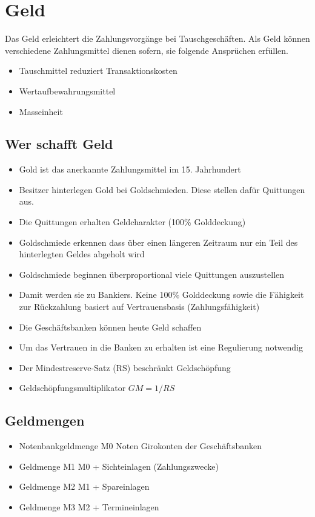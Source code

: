\section{Geld}
Das Geld erleichtert die Zahlungsvorgänge bei Tauschgeschäften. Als Geld können verschiedene Zahlungsmittel dienen sofern, sie folgende Ansprüchen erfüllen.
\begin{itemize}
	\item Tauschmittel reduziert Transaktionskosten
	\item Wertaufbewahrungsmittel
	\item Masseinheit
\end{itemize}
\subsection{Wer schafft Geld}
\begin{itemize}
	\item Gold ist das anerkannte Zahlungsmittel im 15. Jahrhundert
	\item Besitzer hinterlegen Gold bei Goldschmieden. Diese stellen dafür Quittungen aus.
	\item Die Quittungen erhalten Geldcharakter (100\% Golddeckung)
	\item Goldschmiede erkennen dass über einen längeren Zeitraum nur ein Teil des hinterlegten Geldes abgeholt wird
	\item Goldschmiede beginnen überproportional viele Quittungen auszustellen
	\item Damit werden sie zu Bankiers. Keine 100\% Golddeckung sowie die Fähigkeit zur Rückzahlung basiert auf Vertrauensbasis (Zahlungsfähigkeit)
	\item Die Geschäftsbanken können heute Geld schaffen
	\item Um das Vertrauen in die Banken zu erhalten ist eine Regulierung notwendig
	\item Der Mindestreserve-Satz (RS) beschränkt Geldschöpfung
	\item Geldschöpfungsmultiplikator $GM= 1/RS$
\end{itemize}
\subsection{Geldmengen}
\begin{itemize}
	\item Notenbankgeldmenge M0
	\subitem Noten Girokonten der Geschäftsbanken
	\item Geldmenge M1
	\subitem M0 + Sichteinlagen (Zahlungszwecke)
	\item Geldmenge M2
	\subitem M1 + Spareinlagen
	\item Geldmenge M3
	\subitem M2 + Termineinlagen
\end{itemize}
